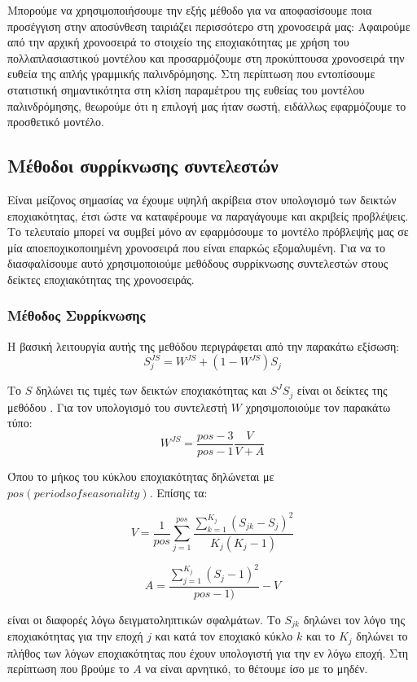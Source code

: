 Μπορούμε να χρησιμοποιήσουμε την εξής μέθοδο για να αποφασίσουμε ποια προσέγγιση στην αποσύνθεση ταιριάζει περισσότερο στη χρονοσειρά μας: Αφαιρούμε από την αρχική χρονοσειρά το στοιχείο της εποχιακότητας με χρήση του πολλαπλασιαστικού μοντέλου και προσαρμόζουμε στη προκύπτουσα χρονοσειρά την ευθεία της απλής γραμμικής παλινδρόμησης. Στη περίπτωση που εντοπίσουμε στατιστική σημαντικότητα στη κλίση παραμέτρου της ευθείας του μοντέλου παλινδρόμησης, θεωρούμε ότι η επιλογή μας ήταν σωστή, ειδάλλως εφαρμόζουμε το προσθετικό μοντέλο.


\subsection{Μέθοδοι συρρίκνωσης συντελεστών} 
Είναι μείζονος σημασίας να έχουμε υψηλή ακρίβεια στον υπολογισμό των δεικτών εποχιακότητας, έτσι ώστε να καταφέρουμε να παραγάγουμε και ακριβείς προβλέψεις. Το τελευταίο μπορεί να συμβεί μόνο αν εφαρμόσουμε το μοντέλο πρόβλεψής μας σε μία αποεποχικοποιημένη χρονοσειρά που είναι επαρκώς εξομαλυμένη. Για να το διασφαλίσουμε αυτό χρησιμοποιούμε μεθόδους συρρίκνωσης συντελεστών στους δείκτες εποχιακότητας της χρονοσειράς.

\subsubsection{Μέθοδος Συρρίκνωσης }

Η βασική λειτουργία αυτής της μεθόδου περιγράφεται από την παρακάτω εξίσωση:
\[ S^{JS}_j = W^{JS} + (1 - W^{JS})S_j\]

Το $S$ δηλώνει τις τιμές των δεικτών εποχιακότητας και $S^JS_j$ είναι οι δείκτες της μεθόδου . Για τον υπολογισμό του συντελεστή $W$ χρησιμοποιούμε τον παρακάτω τύπο:
\[W^{JS} = \frac{pos -3}{pos - 1}\frac{V}{V + A}\]

Όπου το μήκος του κύκλου εποχιακότητας δηλώνεται με $pos (periods of seasonality)$. Επίσης τα:

\[ V = \frac{1}{pos} \sum_{j=1}^{pos} \frac{\sum_{k = 1}^{K_j}(S_{jk} - S_j)^2}{K_j(K_j - 1)} \]

\[ A = \frac{\sum_{j = 1}^{K_j}(S_j - 1)^2}{pos - 1)} - V \]

είναι οι διαφορές λόγω δειγματοληπτικών σφαλμάτων. Το $S_{jk}$ δηλώνει τον λόγο της εποχιακότητας για την εποχή $j$ και κατά τον εποχιακό κύκλο $k$ και το $K_j$ δηλώνει το πλήθος των λόγων εποχιακότητας που έχουν υπολογιστή για την εν λόγω εποχή. Στη περίπτωση που βρούμε το $A$ να είναι αρνητικό, το θέτουμε ίσο με το μηδέν. 

